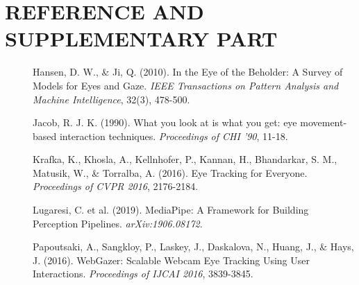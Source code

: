\documentclass[12pt,a4paper]{report}
\begin{document}
\chapter*{REFERENCE AND SUPPLEMENTARY PART}
\begin{description}
    \item[] Hansen, D. W., \& Ji, Q. (2010). In the Eye of the Beholder: A Survey of Models for Eyes and Gaze. \textit{IEEE Transactions on Pattern Analysis and Machine Intelligence}, 32(3), 478-500.
    \item[] Jacob, R. J. K. (1990). What you look at is what you get: eye movement-based interaction techniques. \textit{Proceedings of CHI ’90}, 11-18.
    \item[] Krafka, K., Khosla, A., Kellnhofer, P., Kannan, H., Bhandarkar, S. M., Matusik, W., \& Torralba, A. (2016). Eye Tracking for Everyone. \textit{Proceedings of CVPR 2016}, 2176-2184.
    \item[] Lugaresi, C. et al. (2019). MediaPipe: A Framework for Building Perception Pipelines. \textit{arXiv:1906.08172}.
    \item[] Papoutsaki, A., Sangkloy, P., Laskey, J., Daskalova, N., Huang, J., \& Hays, J. (2016). WebGazer: Scalable Webcam Eye Tracking Using User Interactions. \textit{Proceedings of IJCAI 2016}, 3839-3845.
\end{description}
\end{document}
